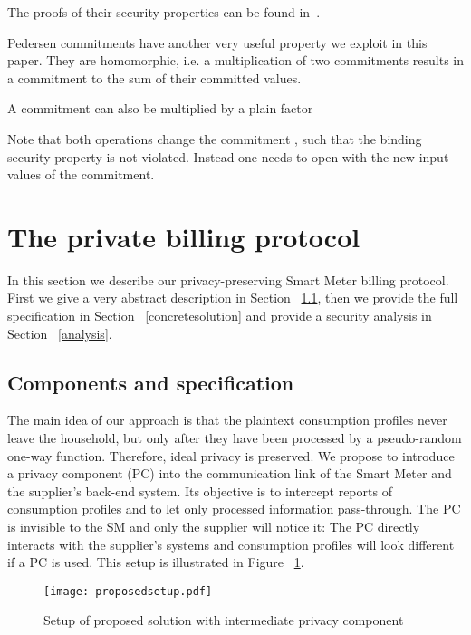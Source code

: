 \documentclass[english]{llncs}
\begin{document}
The proofs of their security properties can be found in~\cite{Ped}.

Pedersen commitments have another very useful property we exploit in this paper.
They are homomorphic, i.e. a multiplication of two commitments results in a commitment to the sum of their committed values.


A commitment can also be multiplied by a plain factor 


Note that both operations change the commitment , such that the binding security property is not violated.
Instead one needs to open with the new input values of the commitment.


\section{The private billing protocol}
\label{sec:private_billing_protocol}
In this section we describe our privacy-preserving Smart Meter billing protocol.
First we give a very abstract description in Section ~\ref{abstractsolution}, then we provide the full specification in Section ~\ref{concretesolution} and provide a security analysis in Section ~\ref{analysis}.


\subsection{Components and specification}
\label{abstractsolution}
The main idea of our approach is that the plaintext consumption profiles never leave the household, but only after they have been processed by a pseudo-random one-way function.
Therefore, ideal privacy is preserved.
We propose to introduce a privacy component (PC) into the communication link of the Smart Meter and the supplier's back-end system.
Its objective is to intercept reports of consumption profiles and to let only processed information pass-through.
The PC is invisible to the SM and only the supplier will notice it: The PC directly interacts with the supplier's systems and consumption profiles will look different if a PC is used.
This setup is illustrated in Figure ~\ref{fig:proposedsolution}. 

\begin{figure}
\texttt{[image: proposedsetup.pdf]}
\caption{Setup of proposed solution with intermediate privacy component}
\label{fig:proposedsolution}
\end{figure}
\end{document}
